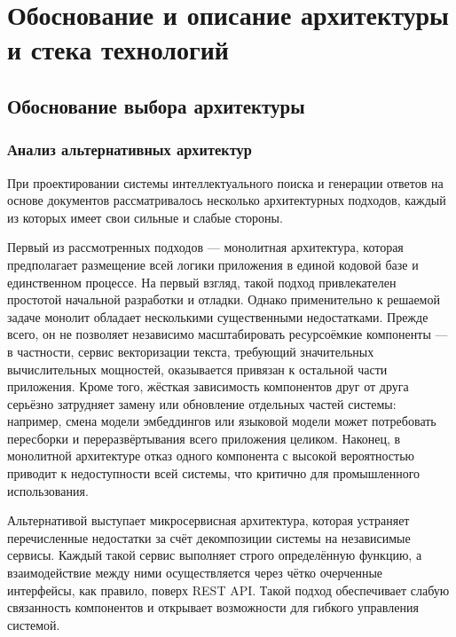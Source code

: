 \section{Обоснование и описание архитектуры и стека технологий}

\subsection{Обоснование выбора архитектуры}

\subsubsection{Анализ альтернативных архитектур}

При проектировании системы интеллектуального поиска и генерации ответов на основе документов рассматривалось несколько архитектурных подходов, каждый из которых имеет свои сильные и слабые стороны.

Первый из рассмотренных подходов — монолитная архитектура, которая предполагает размещение всей логики приложения в единой кодовой базе и единственном процессе. На первый взгляд, такой подход привлекателен простотой начальной разработки и отладки. Однако применительно к решаемой задаче монолит обладает несколькими существенными недостатками. Прежде всего, он не позволяет независимо масштабировать ресурсоёмкие компоненты — в частности, сервис векторизации текста, требующий значительных вычислительных мощностей, оказывается привязан к остальной части приложения. Кроме того, жёсткая зависимость компонентов друг от друга серьёзно затрудняет замену или обновление отдельных частей системы: например, смена модели эмбеддингов или языковой модели может потребовать пересборки и переразвёртывания всего приложения целиком. Наконец, в монолитной архитектуре отказ одного компонента с высокой вероятностью приводит к недоступности всей системы, что критично для промышленного использования.

Альтернативой выступает микросервисная архитектура, которая устраняет перечисленные недостатки за счёт декомпозиции системы на независимые сервисы. Каждый такой сервис выполняет строго определённую функцию, а взаимодействие между ними осуществляется через чётко очерченные интерфейсы, как правило, поверх REST API. Такой подход обеспечивает слабую связанность компонентов и открывает возможности для гибкого управления системой.

